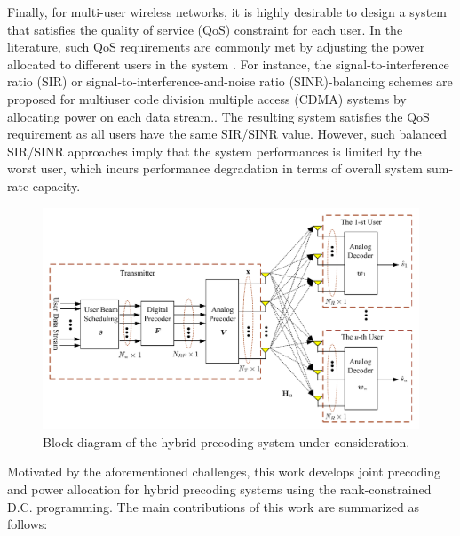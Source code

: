 \documentclass[10pt,journal,twocolumn,twoside]{IEEEtran}
\begin{document}
Finally, for multi-user wireless networks, it is highly desirable to design a system that satisfies the quality of service (QoS) constraint for each user. In the literature, such QoS requirements are commonly met by adjusting the power allocated to different users in the system \cite{palomar2004optimum}. For instance, the signal-to-interference ratio (SIR) or signal-to-interference-and-noise ratio (SINR)-balancing schemes are proposed for multiuser code division multiple access (CDMA) systems by allocating power on each data stream.\cite{xie2017sinr}. The resulting system satisfies the QoS requirement as all users have the same SIR/SINR value. However,  such balanced SIR/SINR approaches imply that the system performances is limited by the worst user, which incurs performance degradation in terms of overall system sum-rate capacity.

\begin{figure}[ht]
	\begin{center}
		\includegraphics[scale=0.6]{Figure/SystemSchematic_new.pdf}
		\caption{Block diagram of the hybrid precoding system under consideration.}\label{fig:BlockDiagram}
	\end{center}
\end{figure}


Motivated by the aforementioned challenges, this work develops joint precoding and power allocation for hybrid precoding systems using the rank-constrained D.C. programming. The main contributions of this work are summarized as follows:
\end{document}
